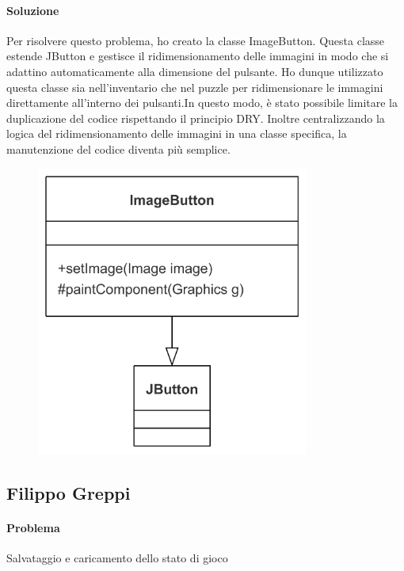\documentclass[a4paper,12pt]{report}
\begin{document}
\paragraph{Soluzione}Per risolvere questo problema, ho creato la classe ImageButton. Questa classe estende JButton e gestisce il ridimensionamento delle immagini in modo che si adattino automaticamente alla dimensione del pulsante. Ho dunque utilizzato questa classe sia nell'inventario che nel puzzle per ridimensionare le immagini direttamente all'interno dei pulsanti.In questo modo, è stato possibile limitare la duplicazione del codice rispettando il principio DRY. Inoltre centralizzando la logica del ridimensionamento delle immagini in una classe specifica, la manutenzione del codice diventa più semplice. 
\begin{figure}   %
    \centering
    \includegraphics[width=0.8\textwidth]{img/button.png}  %
    \label{img:button}
\end{figure}
%
\subsection{Filippo Greppi}
%
%
\paragraph{Problema} Salvataggio e caricamento dello stato di gioco
\end{document}
